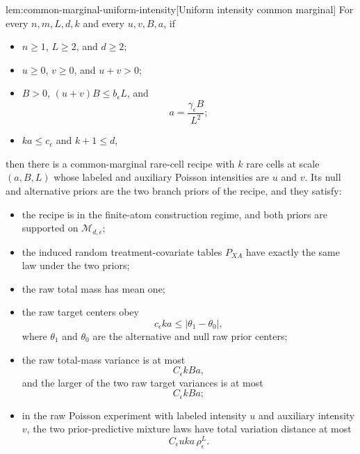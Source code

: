 \begin{lemmav}{lem:common-marginal-uniform-intensity}[Uniform intensity common marginal]
For every \(n,m,L,d,k\) and every \(u,v,B,a\), if
\begin{itemize}
\item \(n\ge1\), \(L\ge2\), and \(d\ge2\);
\item \(u\ge0\), \(v\ge0\), and \(u+v>0\);
\item \(B>0\), \((u+v)B\le b_\epsilon L\), and
\[
a=\frac{\gamma_\epsilon B}{L^2};
\]
\item \(ka\le c_\epsilon\) and \(k+1\le d\),
\end{itemize}
then there is a common-marginal rare-cell recipe with \(k\) rare cells at scale \((a,B,L)\) whose labeled and auxiliary Poisson intensities are \(u\) and \(v\). Its null and alternative priors are the two branch priors of the recipe, and they satisfy:
\begin{itemize}
\item the recipe is in the finite-atom construction regime, and both priors are supported on \(\mathcal M_{d,\epsilon}\);
\item the induced random treatment-covariate tables \(P_{XA}\) have exactly the same law under the two priors;
\item the raw total mass has mean one;
\item the raw target centers obey
\[
c_\epsilon ka
\le
\left|
\theta_1-\theta_0
\right|,
\]
where \(\theta_1\) and \(\theta_0\) are the alternative and null raw prior centers;
\item the raw total-mass variance is at most
\[
C_\epsilon kBa,
\]
and the larger of the two raw target variances is at most
\[
C_\epsilon kBa;
\]
\item in the raw Poisson experiment with labeled intensity \(u\) and auxiliary intensity \(v\), the two prior-predictive mixture laws have total variation distance at most
\[
C_\epsilon uka\,\rho_\epsilon^L .
\]
\end{itemize}
\end{lemmav}

